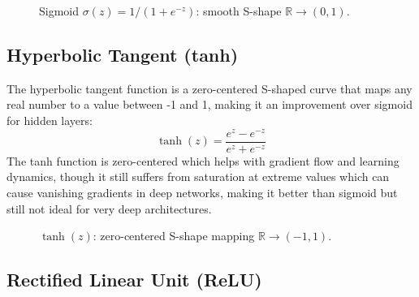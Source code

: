 \begin{figure}[htbp]
\centering
{}
\caption{Sigmoid $\sigma(z)=1/(1+e^{-z})$: smooth S-shape $\mathbb{R}\to(0,1)$.}
\label{fig:sigmoid-plot}
\end{figure}

\subsection{Hyperbolic Tangent (tanh)}

The hyperbolic tangent function is a zero-centered S-shaped curve that maps any real number to a value between -1 and 1, making it an improvement over sigmoid for hidden layers:
\begin{equation}
\tanh(z) = \frac{e^z - e^{-z}}{e^z + e^{-z}}
\end{equation} The tanh function is zero-centered which helps with gradient flow and learning dynamics, though it still suffers from saturation at extreme values which can cause vanishing gradients in deep networks, making it better than sigmoid but still not ideal for very deep architectures.

\begin{figure}[htbp]
\centering
{}
\caption{$\tanh(z)$: zero-centered S-shape mapping $\mathbb{R}\to(-1,1)$.}
\label{fig:tanh-plot}
\end{figure}

\subsection{Rectified Linear Unit (ReLU)}

